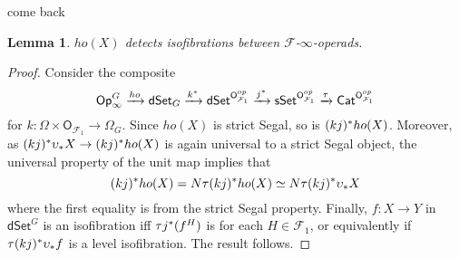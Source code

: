 \documentclass[a4paper,10pt
,draft
]{article}%
\numberwithin{equation}{section}
\numberwithin{figure}{section}
\newtheorem{lemma}[equation]{Lemma}%
\theoremstyle{definition} %
\newcommand{\sSet}{\ensuremath{\mathsf{sSet}}}%
\newcommand{\Cat}{\mathsf{Cat}}
\newcommand{\Op}{\mathsf{Op}}%
\newcommand{\dSet}{\mathsf{dSet}}
\newcommand{\F}{\ensuremath{\mathcal F}}
\newcommand{\1}{\ensuremath{\mathbbm 1}}%
\begin{document}
come back

\begin{lemma}
      $ho(X)$ detects isofibrations between $\F$-$\infty$-operads.
\end{lemma}
\begin{proof}
      Consider the composite
      \[
            \Op^G_\infty \xrightarrow{ho}
            \dSet_G \xrightarrow{k^{\**}}
            \dSet^{\mathsf O_{\F_1}^{op}} \xrightarrow{j^{\**}}
            \sSet^{\mathsf O_{\F_1}^{op}} \xrightarrow{\tau}
            \Cat^{\mathsf O_{\F_1}^{op}}
      \]
      for $k \colon \Omega \times \mathsf O_{\F_1} \to \Omega_G$.
      Since $ho(X)$ is strict Segal, so is $(kj)^{\**} ho(X)$. %
      Moreover, as $(kj)^{\**} \upsilon_{\**} X \to (kj)^{\**} ho(X)$ is again universal to a strict Segal object,
      the universal property of the unit map implies that
      \[
            (kj)^{\**}ho(X) = N \tau (kj)^{\**} ho(X) \simeq N \tau (kj)^{\**} \upsilon_{\**} X
      \]
      where the first equality is from the strict Segal property.
      Finally, $f \colon X \to Y$ in $\dSet^G$ is an isofibration iff $\tau j^{\**}(f^H)$ is for each $H \in \F_1$,
      or equivalently if $\tau (kj)^{\**} \upsilon_{\**} f$ is a level isofibration.
      The result follows.
\end{proof}
\end{document}
